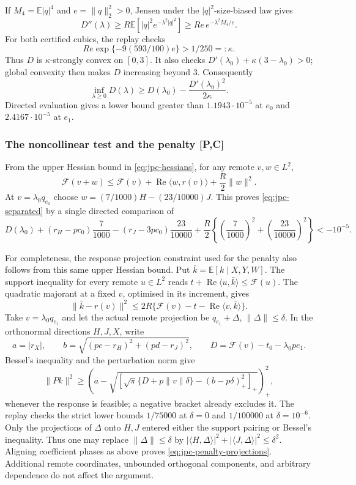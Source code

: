 If $M_4=\mathbb E|q|^4$ and $e=\|q\|_2^2>0$, Jensen under the
$|q|^2$-size-biased law gives
\[
 D''(\lambda)\ge R\mathbb E[|q|^2e^{-\lambda^2|q|^2}]
       \ge Re\,e^{-\lambda^2M_4/e}.
\]
For both certified cubics, the replay checks
\[
 Re\exp\{-9(593/100)e\}>1/250=:\kappa.
\]
Thus $D$ is $\kappa$-strongly convex on $[0,3]$.
It also checks $D'(\lambda_0)+\kappa(3-\lambda_0)>0$;
global convexity then makes $D$ increasing beyond $3$. Consequently
\begin{equation}\label{eq:jpc-all-lambda-check}
 \inf_{\lambda\ge0}D(\lambda)
 \ge D(\lambda_0)-\frac{D'(\lambda_0)^2}{2\kappa}.
\end{equation}
Directed evaluation gives a lower bound greater than $1.1943\cdot10^{-5}$
at $e_0$ and $2.4167\cdot10^{-5}$ at $e_1$.

\subsubsection{The noncollinear test and the penalty [P,C]}
From the upper Hessian bound in \eqref{eq:jpc-hessians}, for any remote
$v,w\in L^2$,
\[
 \mathcal F(v+w)\le\mathcal F(v)
       +\operatorname{Re}\langle w,r(v)\rangle+\frac R2\|w\|^2.
\]
At $v=\lambda_0q_{e_0}$ choose
$w=(7/1000)H-(23/10000)J$. This proves
\eqref{eq:jpc-separated} by a single directed comparison of
\[
 D(\lambda_0)+(r_H-pc_0)\frac7{1000}
 -(r_J-3pc_0)\frac{23}{10000}
 +\frac R2\left\{\left(\frac7{1000}\right)^2+
                  \left(\frac{23}{10000}\right)^2\right\}
 <-10^{-5}.
\]

For completeness, the response projection constraint used for the penalty
also follows from this same upper Hessian bound. Put $\bar k=\mathbb E[k\mid X,Y,W]$.
The support inequality for every remote $u\in L^2$ reads
$t+\operatorname{Re}\langle u,\bar k\rangle\le\mathcal F(u)$.
The quadratic majorant at a fixed $v$, optimised in its increment, gives
\[
 \|\bar k-r(v)\|^2\le2R\{\mathcal F(v)-t-
                           \operatorname{Re}\langle v,\bar k\rangle\}.
\]
Take $v=\lambda_0q_{e_1}$ and let the actual remote projection be
$q_{e_1}+\Delta$, $\|\Delta\|\le\delta$.
In the orthonormal directions $H,J,X$, write
\[
 a=|r_X|,\qquad b=\sqrt{(pc-r_H)^2+(pd-r_J)^2},\qquad
 D=\mathcal F(v)-t_0-\lambda_0pe_1.
\]
Bessel's inequality and the perturbation norm give
\[
 \|Pk\|^2\ge
 \left(a-\sqrt{\left[\sqrt\pi\{D+p\|v\|\delta\}
                    -(b-p\delta)_+^2\right]_+}\right)_+^2,
\]
whenever the response is feasible; a negative bracket already excludes it.
The replay checks the strict lower bounds $1/75000$ at $\delta=0$
and $1/100000$ at $\delta=10^{-6}$. Only the projections of
$\Delta$ onto $H,J$ entered either the support pairing or Bessel's
inequality. Thus one may replace $\|\Delta\|\le\delta$ by
$|\langle H,\Delta\rangle|^2+|\langle J,\Delta\rangle|^2\le\delta^2$.
Aligning coefficient phases as above proves
\eqref{eq:jpc-penalty-projections}. Additional remote coordinates,
unbounded orthogonal components, and arbitrary dependence do not affect
the argument.


